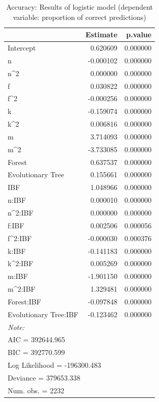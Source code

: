 \documentclass[]{elsarticle} %
\begin{document}
\begin{table}

\caption{\label{tab:model-accuracy-results}\label{tab:model-accuracy-results}Accuracy: Results of logistic model (dependent variable: proportion of correct predictions)}
\centering
\begin{tabular}[t]{lrr}
\toprule
  & Estimate & p.value\\
\midrule
Intercept & 0.620609 & 0.000000\\
n & -0.000102 & 0.000000\\
n\textasciicircum{}2 & 0.000000 & 0.000000\\
f & 0.030822 & 0.000000\\
f\textasciicircum{}2 & -0.000256 & 0.000000\\
\addlinespace
k & -0.159074 & 0.000000\\
k\textasciicircum{}2 & 0.006816 & 0.000000\\
m & 3.714093 & 0.000000\\
m\textasciicircum{}2 & -3.733085 & 0.000000\\
Forest & 0.637537 & 0.000000\\
\addlinespace
Evolutionary Tree & 0.155661 & 0.000000\\
\hline
IBF & 1.048966 & 0.000000\\
n:IBF & 0.000010 & 0.000000\\
n\textasciicircum{}2:IBF & 0.000000 & 0.000000\\
f:IBF & 0.002506 & 0.000056\\
\addlinespace
f\textasciicircum{}2:IBF & -0.000030 & 0.000376\\
k:IBF & -0.141183 & 0.000000\\
k\textasciicircum{}2:IBF & 0.005269 & 0.000000\\
m:IBF & -1.901150 & 0.000000\\
m\textasciicircum{}2:IBF & 1.329481 & 0.000000\\
\addlinespace
Forest:IBF & -0.097848 & 0.000000\\
Evolutionary Tree:IBF & -0.123462 & 0.000000\\
\bottomrule
\multicolumn{3}{l}{\textit{Note: }}\\
\multicolumn{3}{l}{AIC  =  392644.965}\\
\multicolumn{3}{l}{BIC  =  392770.599}\\
\multicolumn{3}{l}{Log Likelihood  =  -196300.483}\\
\multicolumn{3}{l}{Deviance  =  379653.338}\\
\multicolumn{3}{l}{Num. obs.  =  2232}\\
\end{tabular}
\end{table}
\end{document}
